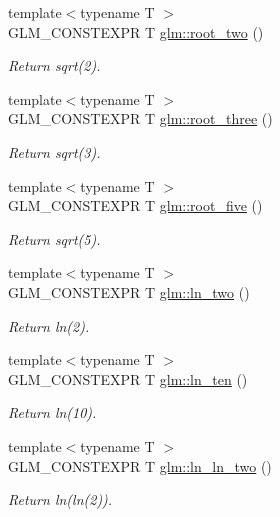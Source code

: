 \begin{DoxyCompactItemize}
{\footnotesize template$<$typename T $>$ }\\G\-L\-M\-\_\-\-C\-O\-N\-S\-T\-E\-X\-P\-R T \hyperlink{group__gtc__constants_ga84cde9a5f5c5528a2846ab43a62f3fd0}{glm\-::root\-\_\-two} ()
\begin{DoxyCompactList}\small\item\em Return sqrt(2). \end{DoxyCompactList}\item 
{\footnotesize template$<$typename T $>$ }\\G\-L\-M\-\_\-\-C\-O\-N\-S\-T\-E\-X\-P\-R T \hyperlink{group__gtc__constants_gaf3f205c738a519ec082dd8a67968549c}{glm\-::root\-\_\-three} ()
\begin{DoxyCompactList}\small\item\em Return sqrt(3). \end{DoxyCompactList}\item 
{\footnotesize template$<$typename T $>$ }\\G\-L\-M\-\_\-\-C\-O\-N\-S\-T\-E\-X\-P\-R T \hyperlink{group__gtc__constants_gaafa225f0ab07202dd270d6537a5e1df8}{glm\-::root\-\_\-five} ()
\begin{DoxyCompactList}\small\item\em Return sqrt(5). \end{DoxyCompactList}\item 
{\footnotesize template$<$typename T $>$ }\\G\-L\-M\-\_\-\-C\-O\-N\-S\-T\-E\-X\-P\-R T \hyperlink{group__gtc__constants_gac2f30635c140a0e753d3eb26f63446dd}{glm\-::ln\-\_\-two} ()
\begin{DoxyCompactList}\small\item\em Return ln(2). \end{DoxyCompactList}\item 
{\footnotesize template$<$typename T $>$ }\\G\-L\-M\-\_\-\-C\-O\-N\-S\-T\-E\-X\-P\-R T \hyperlink{group__gtc__constants_ga43d82c8d42443486d20ccc17ec797770}{glm\-::ln\-\_\-ten} ()
\begin{DoxyCompactList}\small\item\em Return ln(10). \end{DoxyCompactList}\item 
{\footnotesize template$<$typename T $>$ }\\G\-L\-M\-\_\-\-C\-O\-N\-S\-T\-E\-X\-P\-R T \hyperlink{group__gtc__constants_ga554ba051aa168c8e19072f2b1ebf1ef8}{glm\-::ln\-\_\-ln\-\_\-two} ()
\begin{DoxyCompactList}\small\item\em Return ln(ln(2)). \end{DoxyCompactList}\item 

\end{DoxyCompactItemize}
